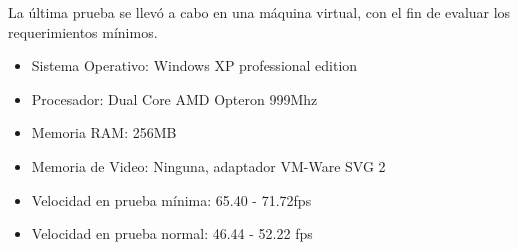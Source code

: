 La última prueba se llevó a cabo en una máquina virtual, con el fin de evaluar los requerimientos mínimos.

\begin{itemize}
 \item Sistema Operativo: Windows XP professional edition
 \item Procesador: Dual Core AMD Opteron 999Mhz
 \item Memoria RAM: 256MB
 \item Memoria de Video: Ninguna, adaptador VM-Ware SVG 2
 \item Velocidad en prueba mínima: 65.40 - 71.72fps
 \item Velocidad en prueba normal: 46.44 - 52.22 fps
\end{itemize}

